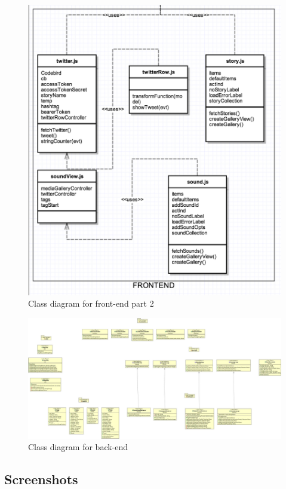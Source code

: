 \documentclass[12pt,a4paper,titlepage]{article}
\begin{document}
\begin{figure}[!h]
\centering
\includegraphics[width=1 \textwidth] {classFront2.png}
\caption{Class diagram for front-end part 2}
\end{figure}

\begin{figure}[!h]
\centering
\includegraphics[width=1.3\textwidth, angle=270] {classBack.jpg}
\caption{Class diagram for back-end}
\end{figure}
\clearpage

\subsection{Screenshots}
\end{document}
